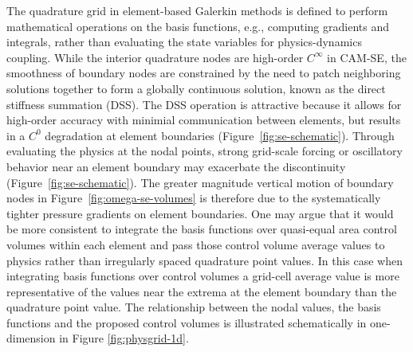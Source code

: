 \documentclass[twocol]{ametsoc}
\begin{document}
The quadrature grid in element-based Galerkin methods is defined to perform mathematical operations on the basis functions, e.g., computing gradients and integrals, rather than evaluating the state variables for physics-dynamics coupling. While the interior quadrature nodes are high-order $C^{\infty}$ in CAM-SE, the smoothness of boundary nodes are constrained by the need to patch neighboring solutions together to form a globally continuous solution, known as the direct stiffness summation (DSS). The DSS operation is attractive because it allows for high-order accuracy with minimial communication between elements, but results in a $C^0$ degradation at element boundaries (Figure~\ref{fig:se-schematic}). Through evaluating the physics at the nodal points, strong grid-scale forcing or oscillatory behavior near an element boundary may exacerbate the discontinuity (Figure~\ref{fig:se-schematic}). The greater magnitude vertical motion of boundary nodes in Figure~\ref{fig:omega-se-volumes} is therefore due to the systematically tighter pressure gradients on element boundaries. One may argue that it would be more consistent to integrate the basis functions over quasi-equal area control volumes within each element and pass those control volume average values to physics rather than irregularly spaced quadrature point values. In this case when integrating basis functions over control volumes a grid-cell average value is more representative of the values near the extrema at the element boundary than the quadrature point value. The relationship between the nodal values, the basis functions and the proposed control volumes is illustrated schematically in one-dimension in Figure \ref{fig:physgrid-1d}. 
\end{document}
